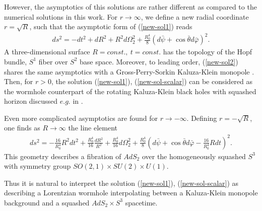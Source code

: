 \documentclass[showpacs,preprintnumbers,amsmath,amssymb,floatfix]{revtex4}
\begin{document}
\begin{appendix}
However, the asymptotics of this solutions are rather different as compared to the 
numerical solutions in this work.
For $r\to \infty$, we define a new radial coordinate $r=\sqrt{R}$, 
such that the asymptotic form of (\ref{new-sol1})
reads 
\begin{eqnarray}
\label{new-sol2}
ds^2=-dt^2+ dR^2+R^2d\Omega_2^2+\frac{R_0^4}{8}
(d\bar \psi+\cos \bar \theta d\bar \varphi )^2.
\end{eqnarray}
A three-dimensional
surface $R = const.,~t = const.$ has the topology of the Hopf bundle, 
$S^1$ fiber over $S^2$ base space.
Moreover, to leading order, (\ref{new-sol2})
shares the same asymptotics with a Gross-Perry-Sorkin Kaluza-Klein monopole \cite{Gross:1983hb}.
Then, for $r>0$, the solution (\ref{new-sol1}), (\ref{new-sol-scalar}) can be considered 
as the wormhole counterpart of the rotating Kaluza-Klein black holes
with squashed horizon discussed $e.g.$ in \cite{Nakagawa:2008rm}.

Even more complicated asymptotics are found for $r \to -\infty$.
Defining $r=-\sqrt{R}$, one finds as $R\to \infty$ the line element
\begin{eqnarray}
\label{new-sol3}
ds^2=-\frac{16}{R_0^4} R^2dt^2+ \frac{R_0^4 }{16} \frac{ dR^2 }{ R^2}+\frac{R_0^4}{16}d\Omega_2^2+\frac{R_0^4}{8}
(d\bar \psi+\cos \bar \theta d\bar \varphi -\frac{16}{R_0^4}Rdt)^2.
\end{eqnarray}
This geometry
describes a fibration of $AdS_2$ over the homogeneously squashed $S^3$ with symmetry
group $SO(2, 1) \times SU(2) \times U(1)$.

Thus it is natural to interpret the solution (\ref{new-sol1}), (\ref{new-sol-scalar}) 
as describing a  Lorentzian wormhole interpolating between a 
Kaluza-Klein monopole background and a squashed
 $AdS_2\times S^3$ spacetime.
 
  
\end{appendix}
\end{document}

